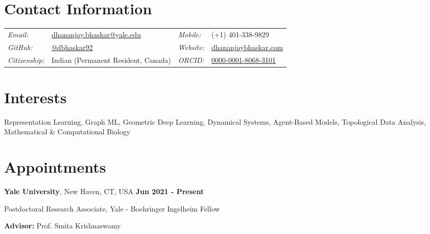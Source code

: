 \documentclass[margin,line]{res}
\newenvironment{list1}{
  \begin{list}{\ding{113}}{
      \setlength{\itemsep}{0in}
      \setlength{\parsep}{0in} \setlength{\parskip}{0in}
      \setlength{\topsep}{0in} \setlength{\partopsep}{0in}
      \setlength{\leftmargin}{0.17in}}}{\end{list}}
\begin{document}
\pagestyle{plain}


\begin{resume}

\vspace*{.2cm}

\section{\sc Contact Information}

\renewcommand{\arraystretch}{1.1}
\begin{tabular}{@{}p{1.8cm}p{6.3cm}p{2.1cm}p{4cm}}
{\it Email:} & \href{mailto:dhananjay.bhaskar@yale.edu}{dhananjay.bhaskar@yale.edu} & {\it Mobile:} & (+1) 401-338-9829  \\
{\it GitHub:} & \href{https://github.com/dbhaskar92}{@dbhaskar92} & {\it Website:} & \href{http://dhananjaybhaskar.com}{dhananjaybhaskar.com} \\
{\it Citizenship:} & Indian (Permanent Resident, Canada) & {\it ORCID:} & \href{https://orcid.org/0000-0001-8068-3101}{0000-0001-8068-3101} \\
\end{tabular}

\vspace*{.05cm}

\section{\sc Interests} Representation Learning, Graph ML, Geometric Deep Learning, Dynamical Systems, 
Agent-Based Models, Topological Data Analysis, Mathematical \& Computational Biology

\vspace*{.05cm}

\section{\sc Appointments}

{\bf Yale University}, New Haven, CT, USA  \hfill {\bf Jun 2021 - Present}\\
\vspace*{-.2cm}
\begin{list1}
\item[] Postdoctoral Research Associate, Yale - Boehringer Ingelheim Fellow
\vspace*{.1cm}
\item[] {\bf Advisor:} Prof. Smita Krishnaswamy
\end{list1}


\end{resume}
\end{document}
